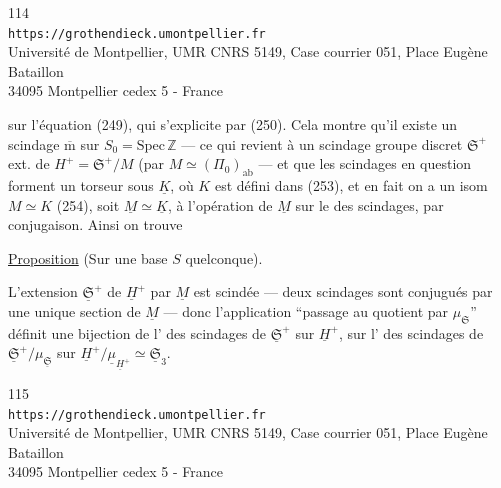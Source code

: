 
\begin{center}
\small
114\\
\texttt{https://grothendieck.umontpellier.fr}\\
Université de Montpellier, UMR CNRS 5149, Case courrier 051, Place Eugène Bataillon\\
34095 Montpellier cedex 5 - France
\end{center}


sur l'équation (249), qui s'explicite par (250).
Cela montre qu'il existe un scindage
$\overline{\mathrm m}$ sur $S_0=\mathrm{Spec}\,\mathbb Z$
--- ce qui revient à un scindage  groupe discret
$\mathfrak S^+$ ext. de
$H^+=\mathfrak S^+/M$
(par $M\simeq(\Pi_0)_{\mathrm{ab}}$ \unsure{)}
--- et que les scindages en question forment un
torseur sous $\underline K$, où $K$
est défini dans (253), et en fait 
on a un isom $M\simeq K$ (254), soit
$\underline M\simeq\underline K$, 
à l'opération de $\underline M$ sur le 
des scindages, par conjugaison. Ainsi on trouve

\uline{Proposition} (Sur une base $S$ quelconque).

L'extension $\underline{\mathfrak S}^+$ de
$\underline H^+$ par $\underline M$ est scindée ---
deux scindages sont conjugués par une unique section
de $\underline M$ --- donc l'application 
``passage au quotient par $\mu_{\mathfrak S}$'' définit une
bijection de l' des scindages de
$\underline{\mathfrak S}^+$ sur $\underline H^+$,
sur l' des scindages de
$\underline{\mathfrak S}^+/\mu_{\underline{\mathfrak S}}$
sur $\underline H^+/\underline\mu_{\underline H^+}
\simeq\underline{\mathfrak S}_3$.


\begin{center}
\small
115\\
\texttt{https://grothendieck.umontpellier.fr}\\
Université de Montpellier, UMR CNRS 5149, Case courrier 051, Place Eugène Bataillon\\
34095 Montpellier cedex 5 - France
\end{center}



